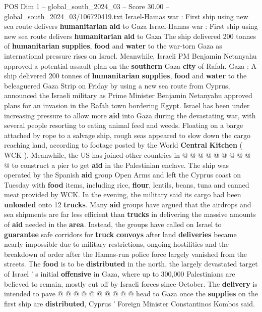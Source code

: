 \begin{textsample}{POS Dim 1 – global\_south\_2024\_03 – Score 30.00 – global\_south\_2024\_03/106720419.txt}  \label{ex:f1_pos_018}
Israel-Hamas war : First ship using new sea route delivers \textbf{humanitarian} \textbf{aid} to Gaza Israel-Hamas war : First ship using new sea route delivers \textbf{humanitarian} \textbf{aid} to Gaza The ship delivered 200 tonnes of \textbf{humanitarian} \textbf{supplies}, \textbf{food} and \textbf{water} to the war-torn Gaza as international pressure rises on Israel.
Meanwhile, Israeli PM Benjamin Netanyahu approved a potential assault plan on the \textbf{southern} Gaza \textbf{city} of Rafah.
Gaza : A ship delivered 200 tonnes of \textbf{humanitarian} \textbf{supplies}, \textbf{food} and \textbf{water} to the beleaguered Gaza Strip on Friday by using a new sea route from Cyprus, announced the Israeli military as Prime Minister Benjamin Netanyahu approved plans for an invasion in the Rafah town bordering Egypt.
Israel has been under increasing pressure to allow more \textbf{aid} into Gaza during the devastating war, with several people resorting to eating animal feed and weeds.
Floating on a barge attached by rope to a salvage ship, rough seas appeared to slow down the cargo reaching land, according to footage posted by the World \textbf{Central} \textbf{Kitchen} ( WCK ).
Meanwhile, the US has joined other countries in @ @ @ @ @ @ @ @ @ @ to construct a pier to get \textbf{aid} in the Palestinian enclave.
The ship was operated by the Spanish \textbf{aid} group Open Arms and left the Cyprus coast on Tuesday with \textbf{food} items, including rice, \textbf{flour}, lentils, beans, tuna and canned meat provided by WCK.
In the evening, the military said its cargo had been \textbf{unloaded} onto 12 \textbf{trucks}.
Many \textbf{aid} groups have argued that the airdrops and sea shipments are far less efficient than \textbf{trucks} in delivering the massive amounts of \textbf{aid} needed in the \textbf{area}.
Instead, the groups have called on Israel to \textbf{guarantee} safe corridors for \textbf{truck} \textbf{convoys} after land \textbf{deliveries} became nearly impossible due to military restrictions, ongoing hostilities and the breakdown of order after the Hamas-run police force largely vanished from the streets.
The \textbf{food} is to be \textbf{distributed} in the north, the largely devastated target of Israel ' s initial \textbf{offensive} in Gaza, where up to 300,000 Palestinians are believed to remain, mostly cut off by Israeli forces since October.
The \textbf{delivery} is intended to pave @ @ @ @ @ @ @ @ @ @ head to Gaza once the \textbf{supplies} on the first ship are \textbf{distributed}, Cyprus ' Foreign Minister Constantinos Kombos said.

\end{textsample}
